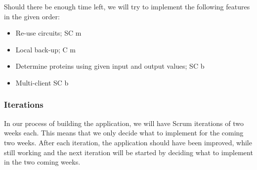 \documentclass[a4paper]{article}
\begin{document}
Should there be enough time left, we will try to implement the following features in the given order:
\begin{itemize}
\item Re-use circuits;											\tabto{13.8cm} SC \tabto{14.6cm} m
\item Local back-up;											\tabto{13.8cm}  C \tabto{14.6cm} m
\item Determine proteins using given input and output values;	\tabto{13.8cm} SC \tabto{14.6cm} b
\item Multi-client												\tabto{13.8cm} SC \tabto{14.6cm} b
\end{itemize}

\pagebreak
\subsubsection{Iterations}
In our process of building the application, we will have Scrum iterations of two weeks each. This means that we only decide what to implement for the coming two weeks. After each iteration, the application should have been improved, while still working and the next iteration will be started by deciding what to implement in the two coming weeks. \\
\end{document}
